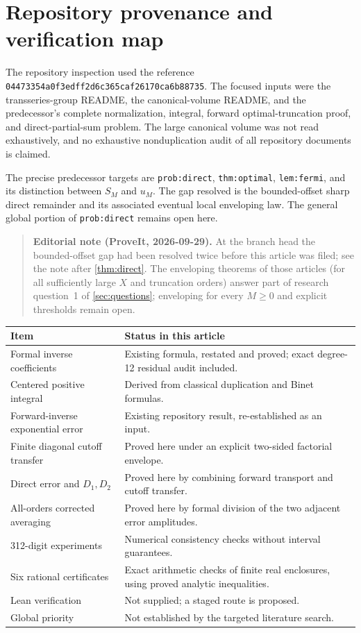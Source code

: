 \documentclass[11pt,a4paper]{article}
\theoremstyle{definition}
\numberwithin{equation}{section}
\begin{document}
\appendix
\section{Repository provenance and verification map}
\label{app:provenance}
The repository inspection used the reference
\texttt{04473354a0f3edff2d6c365caf26170ca6b88735}. The focused inputs were the transseries-group README, the canonical-volume README, and the predecessor's complete normalization, integral, forward optimal-truncation proof, and direct-partial-sum problem. The large canonical volume was not read exhaustively, and no exhaustive nonduplication audit of all repository documents is claimed.

The precise predecessor targets are \texttt{prob:direct}, \texttt{thm:optimal}, \texttt{lem:fermi}, and its distinction between $S_M$ and $u_M$. The gap resolved is the bounded-offset sharp direct remainder and its associated eventual local enveloping law. The general global portion of \texttt{prob:direct} remains open here.

\begin{quote}\small\textbf{Editorial note (ProveIt, 2026-09-29).} At the branch head the bounded-offset gap had been resolved twice before this article was filed; see the note after \cref{thm:direct}. The enveloping theorems of those articles (for all sufficiently large $X$ and truncation orders) answer part of research question~1 of \cref{sec:questions}; enveloping for every $M\ge0$ and explicit thresholds remain open.\end{quote}

\begin{longtable}{p{}p{}}
\toprule
Item & Status in this article\\\midrule\endhead
Formal inverse coefficients & Existing formula, restated and proved; exact degree-12 residual audit included.\\
Centered positive integral & Derived from classical duplication and Binet formulas.\\
Forward-inverse exponential error & Existing repository result, re-established as an input.\\
Finite diagonal cutoff transfer & Proved here under an explicit two-sided factorial envelope.\\
Direct error and $D_1,D_2$ & Proved here by combining forward transport and cutoff transfer.\\
All-orders corrected averaging & Proved here by formal division of the two adjacent error amplitudes.\\
312-digit experiments & Numerical consistency checks without interval guarantees.\\
Six rational certificates & Exact arithmetic checks of finite real enclosures, using proved analytic inequalities.\\
Lean verification & Not supplied; a staged route is proposed.\\
Global priority & Not established by the targeted literature search.\\
\bottomrule
\end{longtable}
\end{document}

